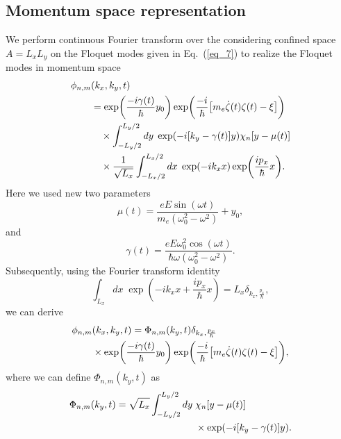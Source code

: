 \subsection{Momentum space representation}

We perform continuous Fourier transform over the considering confined space $A=L_xL_y$ on the Floquet modes given in Eq.~(\ref{eq_7}) to realize the Floquet modes in momentum space
\begin{equation} \label{eq_b8}
  \begin{aligned}
    \phi_{n,m}&(k_x,k_y,t) \\
    & =
    \exp(
     \frac{-i\gamma(t)}{\hbar}
     y_0)
    \exp(\frac{-i}{\hbar}
    \qty[
    m_e \dot{\zeta}(t) \zeta(t) - \xi
    ])\\
    & \quad\times
    \int_{-L_y/2}^{L_y/2} dy\; \exp(-i\qty[k_y - \gamma(t)]y)
    \chi_{n}\qty[y - \mu(t)] \\
     & \quad\times
     \frac{1}{\sqrt{L_x}}
     \int_{-L_x/2}^{L_x/2} dx\;
     \exp(-ik_x x)
     \exp( \frac{i p_x }{\hbar}x ).
  \end{aligned}
\end{equation}
Here we used new two parameters
\begin{equation} \label{eq_b9a}
  \mu(t) = \frac{eE\sin(\omega t)}{m_e(\omega_0^2 - \omega^2)} + y_0,
\end{equation}
and
\begin{equation} \label{eq_b9b}
  \gamma(t) =
  \frac{eE\omega_0^2\cos(\omega t)}{\hbar\omega(\omega_0^2 - \omega^2)}.
\end{equation}
Subsequently, using the Fourier transform identity \cite{bruus04}
\begin{equation} \label{eq_b10}
  \int_{L_x} dx\;
  \exp( -ik_x x + \frac{i p_x }{\hbar}x ) =
  L_x \delta_{k_x,\frac{p_x}{\hbar}},
\end{equation}
we can derive
\begin{equation} \label{eq_b11}
  \begin{aligned}
    \phi_{n,m}&(k_x,k_y,t)  =
    \Phi_{n,m}(k_y,t)
    \delta_{k_x,\frac{p_x}{\hbar}}\\
    & \times
    \exp(
     \frac{-i\gamma(t)}{\hbar}
     y_0)
    \exp(\frac{-i}{\hbar}
    \qty[
    m_e \dot{\zeta}(t) \zeta(t) - \xi
    ]),
  \end{aligned}
\end{equation}
where we can define $\Phi_{n,m}(k_y,t)$ as
\begin{equation} \label{eq_b12}
  \begin{aligned}
    \Phi_{n,m}(k_y,t) =
    \sqrt{L_x}
    \int_{-L_y/2}^{L_y/2} dy\; &
    \chi_{n}\qty[y - \mu(t)] \\
    & \times
    \exp(
      -i\qty[k_y - \gamma(t)]
      y).
  \end{aligned}
\end{equation}
